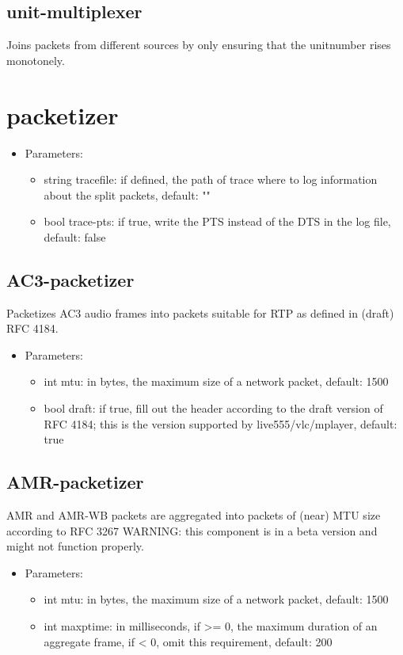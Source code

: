 \subsection{unit-multiplexer}
Joins packets from different sources by only ensuring that the unitnumber rises monotonely.
\newpage
\section{packetizer}

\begin{itemize}
\item Parameters:
\begin{itemize}
\item string tracefile: if defined, the path of trace where to log information about the split packets, default: ""
\item bool trace-pts: if true, write the PTS instead of the DTS in the log file, default: false
\end{itemize}
\end{itemize}
\subsection{AC3-packetizer}
Packetizes AC3 audio frames into packets suitable for RTP as defined in (draft) RFC 4184.
\begin{itemize}
\item Parameters:
\begin{itemize}
\item int mtu: in bytes, the maximum size of a network packet, default: 1500
\item bool draft: if true, fill out the header according to the draft version of RFC 4184; this is the version supported by live555/vlc/mplayer, default: true
\end{itemize}
\end{itemize}
\subsection{AMR-packetizer}
AMR and AMR-WB packets are aggregated into packets of (near) MTU size according to RFC 3267
\newline WARNING: this component is in a beta version and might not function properly.\begin{itemize}
\item Parameters:
\begin{itemize}
\item int mtu: in bytes, the maximum size of a network packet, default: 1500
\item int maxptime: in milliseconds, if >= 0, the maximum duration of an aggregate frame, if < 0, omit this requirement, default: 200
\end{itemize}
\end{itemize}
